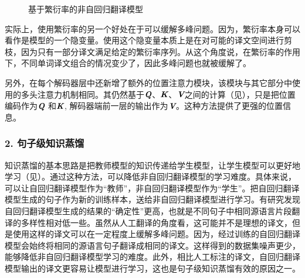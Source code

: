 \begin{figure}[htp]
\centering
 
\caption{基于繁衍率的非自回归翻译模型}
\label{fig:14-14}
\end{figure}

\parinterval 实际上，使用繁衍率的另一个好处在于可以缓解多峰问题。因为，繁衍率本身可以看作是模型的一个隐变量。使用这个隐变量本质上是在对可能的译文空间进行剪枝，因为只有一部分译文满足给定的繁衍率序列。从这个角度说，在繁衍率的作用下，不同单词译文组合的情况变少了，因此多峰问题也就被缓解了。

\parinterval 另外，在每个解码器层中还新增了额外的位置注意力模块，该模块与其它部分中使用的多头注意力机制相同。其仍然基于$\textbf{\em Q}$、$\textbf{\em K}$、$\textbf{\em V}$之间的计算（见{\chaptertwelve}），只是把位置编码作为$\textbf{\em Q}$ 和$\textbf{\em K}$, 解码器端前一层的输出作为$\textbf{\em V}$。这种方法提供了更强的位置信息。


\subsubsection{2. 句子级知识蒸馏}

\parinterval 知识蒸馏的基本思路是把教师模型的知识传递给学生模型，让学生模型可以更好地学习（见\chapterthirteen）。通过这种方法，可以降低非自回归翻译模型的学习难度。具体来说，可以让自回归翻译模型作为“教师”，非自回归翻译模型作为“学生”。把自回归翻译模型生成的句子作为新的训练样本，送给非自回归翻译模型进行学习。有研究发现自回归翻译模型生成的结果的“确定性”更高，也就是不同句子中相同源语言片段翻译的多样性相对低一些。虽然从人工翻译的角度看，这可能并不是理想的译文，但是使用这样的译文可以在一定程度上缓解多峰问题。因为，经过训练的自回归翻译模型会始终将相同的源语言句子翻译成相同的译文。这样得到的数据集噪声更少，能够降低非自回归翻译模型学习的难度。此外，相比人工标注的译文，自回归翻译模型输出的译文更容易让模型进行学习，这也是句子级知识蒸馏有效的原因之一。


